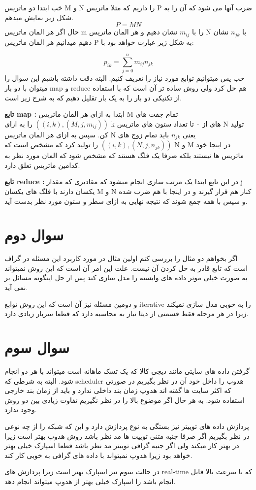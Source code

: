 \documentclass{article}[12pt]
\begin{document}
خب ابتدا دو ماتریس 
M
و 
N
را داریم که مثلا ماتریس P ضرب آنها می شود که آن را به شکل زیر نمایش میدهم. 
\begin{equation*}
P = M N
\end{equation*}
حال اگر هر المان ماتریس m را با 
$m_{ij}$
نشان دهیم و هر المان ماتریس N
با
$n_{jk}$
نشان دهیم میدانیم هر المان ماتریس P به شکل زیر عبارت خواهد بود با:

\begin{equation*}
p_{ik} = \sum_{j=0}^{n} m_{ij} n_{jk}
\end{equation*}
خب پس میتوانیم توابع مورد نیاز را تعریف کنیم. البته دقت داشته باشیم این سوال را میتوان با دو بار map و reduce هم حل کرد ولی روش ساده تر آن است که با استفاده از تکنیکی دو بار را به یک بار تقلیل دهیم که به شرح زیر است. 

\textbf{تابع map
:}
ابتدا به ازای هر المان ماتریس 
M
تمام جفت های 
$((i,k),(M,j,m_{ij}))$
را به ازای k های از ۰ تا تعداد ستون های ماتریس N
تولید کن. سپس به ازای هر المان ماتریس N
یعنی 
$n_{jk}$
باید تمام زوج های 
$((i,k),(N,j,n_{jk}))$
را تولید کرد که مشخص است که N و M در اینجا خود ماتریس ها نیستند بلکه صرفا یک فلگ هستند که مشخص شود که المان مورد نظر به کدامین ماتریس تعلق دارد. 




\textbf{تابع reduce
:} 
در این تابع ابتدا یک مرتب سازی انجام میشود که مقادیری که مقدار j یکسان دارند با فلگ های یکسان M و N کنار هم قرار گیرند و در اینجا با هم ضرب شده و سپس با همه جمع شوند که نتیجه نهایی به ازای سطر و ستون مورد نظر بدست آید. 
\clearpage

\section{سوال دوم}
اگر بخواهم دو مثال را بررسی کنم اولین مثال در مورد کاربرد این مسئله در گراف است که تابع 
قادر به حل کردن آن نیست. 
علت این امر آن است که این روش نمیتواند به صورت خیلی موثر داده های وابسته را مدل سازی کند پس از حل اینگونه مسائل بر نمی آید. 

و دومین مسئله نیز آن است که این روش توابع iterative را به خوبی مدل سازی نمیکند زیرا در هر مرحله فقط قسمتی از دیتا نیاز به محاسبه دارد که قطعا سربار زیادی دارد. 

\section{سوال سوم}
گرفتن داده های سایتی مانند دیجی کالا که یک تسک ماهانه است میتواند با هر دو انجام شود. البته به شرطی که scheduler هدوپ را داخل خود آن در نظر بگیریم در صورتی که اکثر سایت ها گفته اند هدوپ زمان بند داخلی ندارد و باید از زمان بند خارجی استفاده شود. 
به هر حال اگر موضوع بالا را در نظر نگیریم تفاوت زیادی بین دو روش وجود ندارد.  

پردازش داده های توییتر نیز بستگی به نوع پردازش دارد و این که شبکه را از چه نوعی در نظر بگیریم اگر صرفا جنبه متنی توییت ها مد نظر باشد روش هدوپ بهتر است زیرا در
بهتر کار میکند ولی اگر جنبه گرافی توییتر مد نظر باشد قطعا اسپارک خیلی بهتر خواهد بود زیرا هدوپ نمیتواند با داده های گرافی به خوبی کار کند. 

در حالت سوم نیز اسپارک بهتر است زیرا پردازش های real-time که با سرعت بالا قابل انجام باشد را اسپارک خیلی بهتر از هدوپ میتواند انجام دهد. 
\end{document}
